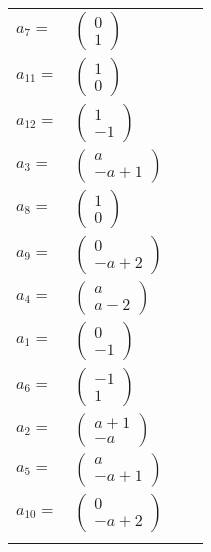 \documentclass[1p]{elsarticle_modified}
\theoremstyle{definition}
\begin{document}
\begin{tabular}{m{7pt} m{180pt} m{7pt} m{180pt} }
\flushright $a_{7}=$&$\begin{pmatrix}0\\1\end{pmatrix}$ \\
\flushright $a_{11}=$&$\begin{pmatrix}1\\0\end{pmatrix}$ \\
\flushright $a_{12}=$&$\begin{pmatrix}1\\-1\end{pmatrix}$ \\
\flushright $a_{3}=$&$\begin{pmatrix}a\\- a+1\end{pmatrix}$ \\
\flushright $a_{8}=$&$\begin{pmatrix}1\\0\end{pmatrix}$ \\
\flushright $a_{9}=$&$\begin{pmatrix}0\\- a+2\end{pmatrix}$ \\
\flushright $a_{4}=$&$\begin{pmatrix}a\\a-2\end{pmatrix}$ \\
\flushright $a_{1}=$&$\begin{pmatrix}0\\-1\end{pmatrix}$ \\
\flushright $a_{6}=$&$\begin{pmatrix}-1\\1\end{pmatrix}$ \\
\flushright $a_{2}=$&$\begin{pmatrix}a+1\\- a\end{pmatrix}$ \\
\flushright $a_{5}=$&$\begin{pmatrix}a\\- a+1\end{pmatrix}$ \\
\flushright $a_{10}=$&$\begin{pmatrix}0\\- a+2\end{pmatrix}$\\&\end{tabular}
\end{document}
